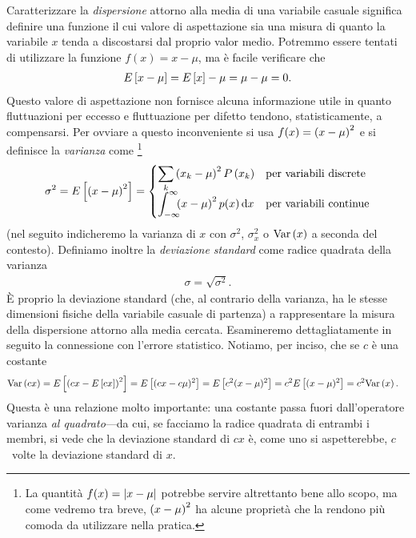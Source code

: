 Caratterizzare la \emph{dispersione} attorno alla media di una variabile
casuale significa definire una funzione il cui valore di aspettazione sia una
misura di quanto la variabile $x$ tenda a discostarsi dal proprio valor medio.
Potremmo essere tentati di utilizzare la funzione $f(x) = x - \mu$, ma è
facile verificare che
\begin{align*}
  \displaystyle E\left[x - \mu\right] = \displaystyle E\left[x\right] - \mu = \mu - \mu = 0.
\end{align*}
Questo valore di aspettazione non fornisce alcuna informazione utile in quanto
fluttuazioni per eccesso e fluttuazione per difetto tendono, statisticamente,
a compensarsi. Per ovviare a questo inconveniente si usa $f(x) = \left( x - \mu \right)^{2}$
e si definisce la \emph{varianza} come%
\footnote{La quantità $f(x) = \left| x - \mu \right|$ potrebbe servire altrettanto
  bene allo scopo, ma come vedremo tra breve, $\left( x - \mu \right)^{2}$ ha alcune
  proprietà che la rendono più comoda da utilizzare nella pratica.}
\begin{align}\label{eq:variance}
  \dccases{\sigma^2 = \expect{\sq{x - \mu}}}%
          {\sum_k \sq{x_k - \mu}\prob{x_k}}%
          {\intinf \sq{x - \mu}p(x)\diff}
\end{align}
(nel seguito indicheremo la varianza di $x$ con $\sigma^2$, $\sigma^2_x$ o
$\text{Var}\left(x\right)$ a seconda del contesto). Definiamo inoltre la
\emph{deviazione standard} come radice quadrata della varianza
\begin{align}\label{eq:sigma}
  \sigma = \sqrt{\sigma^2}.
\end{align}
\`E proprio la deviazione standard (che, al contrario della varianza, ha le
stesse dimensioni fisiche della variabile casuale di partenza) a rappresentare
la misura della dispersione attorno alla media cercata. Esamineremo
dettagliatamente in seguito la connessione con l'errore statistico.
Notiamo, per inciso, che se $c$ è una costante
\begin{align}\label{eq:varianza_cost_molt}
  \text{Var}\left(cx\right) & = \displaystyle E\left[\left(cx - \displaystyle E\left[cx\right]\right)^2\right] =
  \displaystyle E\left[(cx - c\mu)^2\right] =
  \displaystyle E\left[c^2(x - \mu)^2\right] = c^2\displaystyle E\left[(x - \mu)^2\right] = c^2\text{Var}\left(x\right).
\end{align}
Questa è una relazione molto importante: una costante passa fuori
dall'operatore varianza \emph{al quadrato}---da cui, se facciamo la radice
quadrata di entrambi i membri, si vede che la deviazione standard di $cx$
è, come uno si aspetterebbe, $c$~volte la deviazione standard di $x$.

